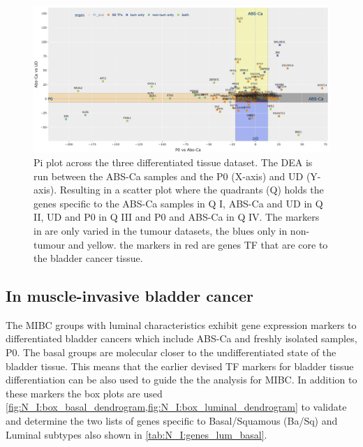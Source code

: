 \begin{figure}
    \includegraphics[width=1.0\textwidth,height=1.0\textheight,keepaspectratio]{Sections/Network_I/Resources/selective_pruning/sel_tfs/sel_tfs_pi_all_var_rect.png}
    \caption[The 98 TF and the DEA across the non-tumour datasets]{Pi plot across the three differentiated tissue dataset. The DEA is run between the ABS-Ca samples and the P0 (X-axis) and UD (Y-axis). Resulting in a scatter plot where the quadrants (Q) holds the genes specific to the ABS-Ca samples in Q I, ABS-Ca and UD in Q II, UD and P0 in Q III and P0 and ABS-Ca in Q IV. The markers in 
    are only varied in the tumour datasets, the blues only in non-tumour and yellow. the markers in red are genes TF that are core to the bladder cancer tissue. }
    \label{fig:N_I:pi_sel_tfs_var}
\end{figure}

\newpage


\subsection{In muscle-invasive bladder cancer} \label{s:N_I:sel_tfs_cancer}


The MIBC groups with luminal characteristics exhibit gene expression markers to differentiated bladder cancers which include ABS-Ca and freshly isolated samples, P0. The basal groups are molecular closer to the undifferentiated state of the bladder tissue. This means that the earlier devised TF markers for bladder tissue differentiation can be also used to guide the the analysis for MIBC. In addition to these markers the box plots are used \cref{fig:N_I:box_basal_dendrogram,fig:N_I:box_luminal_dendrogram} to validate and determine the two lists of genes specific to Basal/Squamous (Ba/Sq) and Luminal subtypes  also shown in \cref{tab:N_I:genes_lum_basal}. 


